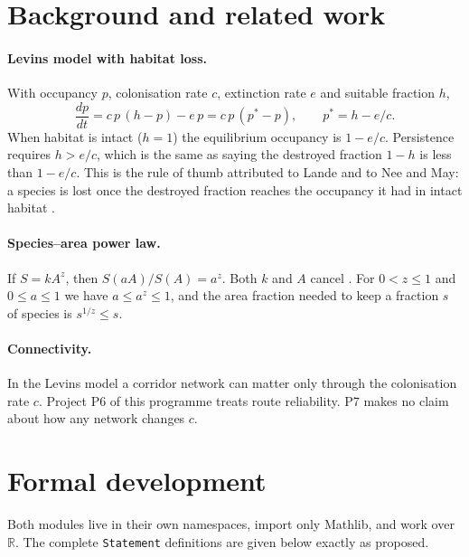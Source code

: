 \documentclass[11pt]{article}
\begin{document}
\section{Background and related work}
\paragraph{Levins model with habitat loss.} With occupancy $p$, colonisation rate $c$, extinction
rate $e$ and suitable fraction $h$,
\[ \frac{dp}{dt} = c\,p\,(h-p) - e\,p = c\,p\,(p^*-p),\qquad p^* = h - e/c. \]
When habitat is intact ($h=1$) the equilibrium occupancy is $1-e/c$. Persistence requires
$h>e/c$, which is the same as saying the destroyed fraction $1-h$ is less than $1-e/c$. This is the
rule of thumb attributed to Lande and to Nee and May: a species is lost once the destroyed
fraction reaches the occupancy it had in intact habitat \citep{Lande1987,NeeMay1992}.

\paragraph{Species--area power law.} If $S=kA^z$, then $S(aA)/S(A)=a^z$. Both $k$ and $A$ cancel
\citep{Arrhenius1921}. For $0<z\le1$ and $0\le a\le1$ we have $a\le a^z\le1$, and the area fraction
needed to keep a fraction $s$ of species is $s^{1/z}\le s$.

\paragraph{Connectivity.} In the Levins model a corridor network can matter only through the
colonisation rate $c$. Project P6 of this programme treats route reliability. P7 makes no claim
about how any network changes $c$.

\section{Formal development}
Both modules live in their own namespaces, import only Mathlib, and work over $\mathbb{R}$. The
complete \texttt{Statement} definitions are given below exactly as proposed.
\end{document}
